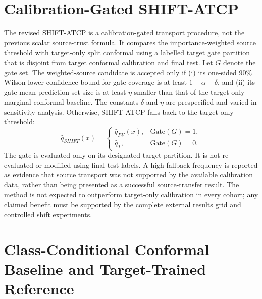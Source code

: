 \section{Calibration-Gated SHIFT-ATCP}
\label{sec:shift_atcp}

The revised SHIFT-ATCP is a calibration-gated transport procedure, not the
previous scalar source-trust formula. It compares the importance-weighted
source threshold with target-only split conformal using a labelled target gate
partition that is disjoint from target conformal calibration and final test.
Let $G$ denote the gate set. The weighted-source candidate is accepted only if
(i) its one-sided 90\% Wilson lower confidence bound for gate coverage is at
least $1-\alpha-\delta$, and (ii) its gate mean prediction-set size is at
least $\eta$ smaller than that of the target-only marginal conformal baseline.
The constants $\delta$ and $\eta$ are prespecified and varied in sensitivity
analysis. Otherwise, SHIFT-ATCP falls back to the target-only threshold:
\begin{equation}
 \widehat q_{SHIFT}(x)=
 \begin{cases}
   \widehat q_{IW}(x), & \mathrm{Gate}(G)=1,\\
   \widehat q_T, & \mathrm{Gate}(G)=0.
 \end{cases}
\end{equation}
The gate is evaluated only on its designated target partition. It is not
re-evaluated or modified using final test labels. A high fallback frequency is
reported as evidence that source transport was not supported by the available
calibration data, rather than being presented as a successful source-transfer
result. The method is not expected to outperform target-only calibration in
every cohort; any claimed benefit must be supported by the complete external
results grid and controlled shift experiments.

\section{Class-Conditional Conformal Baseline and Target-Trained Reference}
\label{sec:mondrian}

